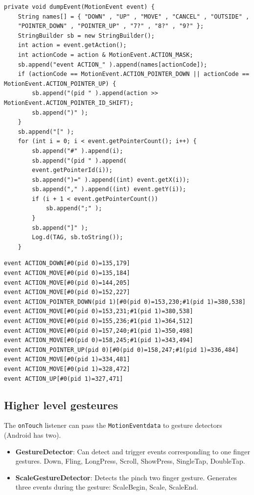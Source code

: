 \begin{lstlisting}[title=Long touch events]
private void dumpEvent(MotionEvent event) {
    String names[] = { "DOWN" , "UP" , "MOVE" , "CANCEL" , "OUTSIDE" ,
    "POINTER_DOWN" , "POINTER_UP" , "7?" , "8?" , "9?" };
    StringBuilder sb = new StringBuilder();
    int action = event.getAction();
    int actionCode = action & MotionEvent.ACTION_MASK;
    sb.append("event ACTION_" ).append(names[actionCode]);
    if (actionCode == MotionEvent.ACTION_POINTER_DOWN || actionCode == MotionEvent.ACTION_POINTER_UP) {
        sb.append("(pid " ).append(action >> MotionEvent.ACTION_POINTER_ID_SHIFT);
        sb.append(")" );
    }
    sb.append("[" );
    for (int i = 0; i < event.getPointerCount(); i++) {
        sb.append("#" ).append(i);
        sb.append("(pid " ).append(
        event.getPointerId(i));
        sb.append(")=" ).append((int) event.getX(i));
        sb.append("," ).append((int) event.getY(i));
        if (i + 1 < event.getPointerCount())
            sb.append(";" );
        }
        sb.append("]" );
        Log.d(TAG, sb.toString());
    }
\end{lstlisting}

\begin{lstlisting}[title=Results]
event ACTION_DOWN[#0(pid 0)=135,179]
event ACTION_MOVE[#0(pid 0)=135,184]
event ACTION_MOVE[#0(pid 0)=144,205]
event ACTION_MOVE[#0(pid 0)=152,227]
event ACTION_POINTER_DOWN(pid 1)[#0(pid 0)=153,230;#1(pid 1)=380,538]
event ACTION_MOVE[#0(pid 0)=153,231;#1(pid 1)=380,538]
event ACTION_MOVE[#0(pid 0)=155,236;#1(pid 1)=364,512]
event ACTION_MOVE[#0(pid 0)=157,240;#1(pid 1)=350,498]
event ACTION_MOVE[#0(pid 0)=158,245;#1(pid 1)=343,494]
event ACTION_POINTER_UP(pid 0)[#0(pid 0)=158,247;#1(pid 1)=336,484]
event ACTION_MOVE[#0(pid 1)=334,481]
event ACTION_MOVE[#0(pid 1)=328,472]
event ACTION_UP[#0(pid 1)=327,471]
\end{lstlisting}


\subsection{Higher level gesteures}

The \texttt{onTouch} listener can pass the \texttt{MotionEventdata} to gesture detectors (Android has two).

\begin{itemize}
    \item \textbf{GestureDetector}: Can detect and trigger events corresponding to one finger gestures.
    Down, Fling, LongPress, Scroll, ShowPress, SingleTap, DoubleTap.
    \item \textbf{ScaleGestureDetector}: Detects the pinch two finger gesture. 
    Generates three events during the gesture: ScaleBegin, Scale, ScaleEnd. 
\end{itemize}


